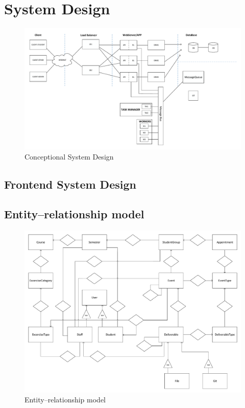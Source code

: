 \section{System Design}

\begin{figure}[!ht]
	\includegraphics[width=\textwidth]{figures/atfogo_rendszerterv_teljes.pdf}
	\caption{Conceptional System Design}
	\label{fig:conceptional-system-design}
\end{figure}


\subsection{Frontend System Design}

\subsection{Entity–relationship model}

\begin{figure}[!ht]
	\includegraphics[width=\textwidth]{figures/ER.pdf}
	\caption{Entity–relationship model}
	\label{fig:er}
\end{figure}

